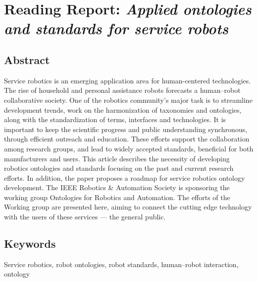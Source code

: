     \newpage
    
    \section{Reading Report: \emph{Applied ontologies and standards for service robots}}
    \cite{Haidegger2013}
    
    \subsection*{Abstract}
    Service robotics is an emerging application area for human-centered technologies. The rise of household
    and personal assistance robots forecasts a human–robot collaborative society. One of the robotics community’s major task is to streamline development trends, work on the harmonization of taxonomies and
    ontologies, along with the standardization of terms, interfaces and technologies. It is important to keep
    the scientific progress and public understanding synchronous, through efficient outreach and education.
    These efforts support the collaboration among research groups, and lead to widely accepted standards,
    beneficial for both manufacturers and users. This article describes the necessity of developing robotics ontologies and standards focusing on the past and current research efforts. In addition, the paper proposes a
    roadmap for service robotics ontology development. The IEEE Robotics \& Automation Society is sponsoring
    the working group Ontologies for Robotics and Automation. The efforts of the Working group are presented
    here, aiming to connect the cutting edge technology with the users of these services — the general public.
    
    
    \subsection*{Keywords}
    Service robotics, robot ontologies, robot standards, human–robot interaction, ontology
    
     
